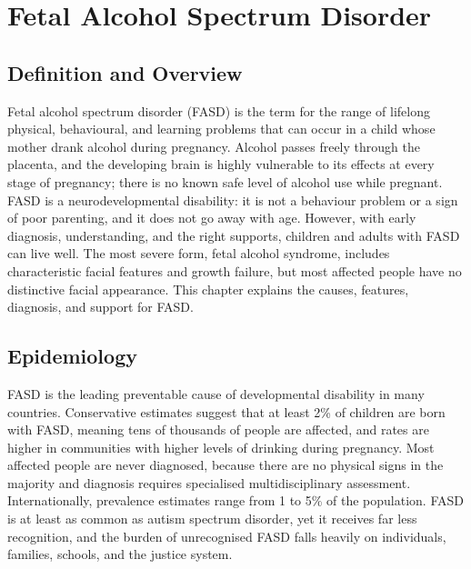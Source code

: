 \chapter{Fetal Alcohol Spectrum Disorder}

\section*{Definition and Overview}
Fetal alcohol spectrum disorder (FASD) is the term for the range of lifelong physical, behavioural, and learning problems that can occur in a child whose mother drank alcohol during pregnancy. Alcohol passes freely through the placenta, and the developing brain is highly vulnerable to its effects at every stage of pregnancy; there is no known safe level of alcohol use while pregnant. FASD is a neurodevelopmental disability: it is not a behaviour problem or a sign of poor parenting, and it does not go away with age. However, with early diagnosis, understanding, and the right supports, children and adults with FASD can live well. The most severe form, fetal alcohol syndrome, includes characteristic facial features and growth failure, but most affected people have no distinctive facial appearance. This chapter explains the causes, features, diagnosis, and support for FASD.

\section*{Epidemiology}
FASD is the leading preventable cause of developmental disability in many countries. Conservative estimates suggest that at least 2\% of children are born with FASD, meaning tens of thousands of people are affected, and rates are higher in communities with higher levels of drinking during pregnancy. Most affected people are never diagnosed, because there are no physical signs in the majority and diagnosis requires specialised multidisciplinary assessment. Internationally, prevalence estimates range from 1 to 5\% of the population. FASD is at least as common as autism spectrum disorder, yet it receives far less recognition, and the burden of unrecognised FASD falls heavily on individuals, families, schools, and the justice system.


